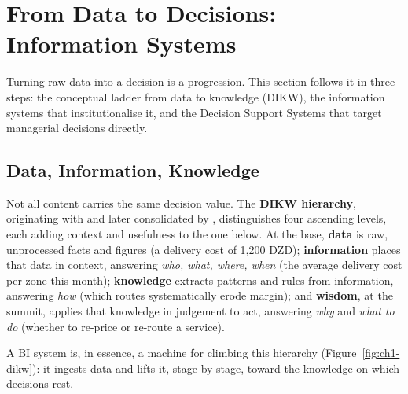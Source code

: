 \section{From Data to Decisions: Information Systems}
\label{sec:ch1-is}

Turning raw data into a decision is a progression. This section follows it in three steps: the
conceptual ladder from data to knowledge (DIKW), the information systems that institutionalise it, and
the Decision Support Systems that target managerial decisions directly.

\subsection{Data, Information, Knowledge}

Not all content carries the same decision value. The \textbf{DIKW hierarchy}, originating with
\textcite{ackoff1989} and later consolidated by \textcite{rowley2007}, distinguishes four ascending
levels, each adding context and usefulness to the one below. At the base, \textbf{data} is raw,
unprocessed facts and figures (\eg a delivery cost of 1{,}200 DZD); \textbf{information} places that
data in context, answering \emph{who, what, where, when} (\eg the average delivery cost per zone this
month); \textbf{knowledge} extracts patterns and rules from information, answering \emph{how} (\eg which
routes systematically erode margin); and \textbf{wisdom}, at the summit, applies that knowledge in
judgement to act, answering \emph{why} and \emph{what to do} (\eg whether to re-price or re-route a
service).

A BI system is, in essence, a machine for climbing this hierarchy (Figure~\ref{fig:ch1-dikw}): it
ingests data and lifts it, stage by stage, toward the knowledge on which decisions rest.

